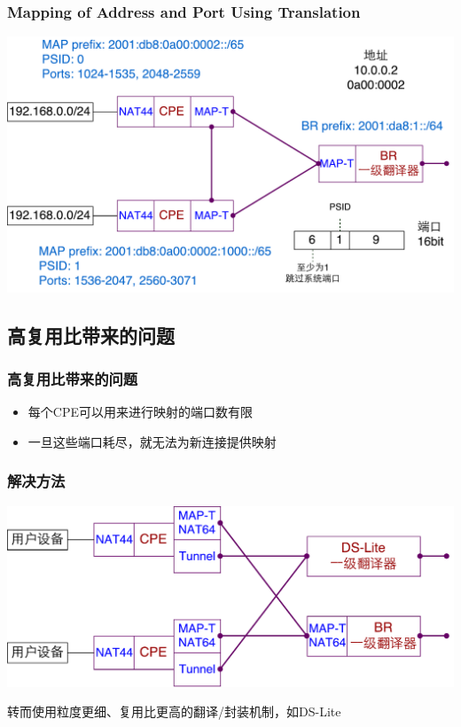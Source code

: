 \documentclass{beamer}
\begin{document}
\begin{frame}
  \frametitle{Mapping of Address and Port Using Translation}

  \includegraphics[width=\textwidth]{figs/MAP-T-details.pdf}  
\end{frame}

\subsection{高复用比带来的问题}

\begin{frame}
  \frametitle{高复用比带来的问题}

  \begin{itemize}
  \item 每个CPE可以用来进行映射的端口数有限
  \item 一旦这些端口耗尽，就无法为新连接提供映射
  \end{itemize}
\end{frame}

\begin{frame}
  \frametitle{解决方法}
  \includegraphics[width=\textwidth]{figs/MAP-T-DS-Lite.pdf}  

  转而使用粒度更细、复用比更高的翻译/封装机制，如DS-Lite
\end{frame}
\end{document}
